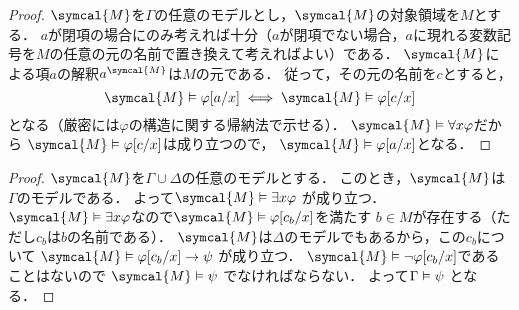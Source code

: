 \begin{proof}
	\(\symcal{M}\)を\(\Gamma\)の任意のモデルとし，\(\symcal{M}\)の対象領域を\(M\)とする．
	\(a\)が閉項の場合にのみ考えれば十分（\(a\)が閉項でない場合，\(a\)に現れる変数記号を\(M\)の任意の元の名前で置き換えて考えればよい）である．
	\(\symcal{M}\)による項\(a\)の解釈\(\interpretation{\symcal{M}}{a}\)は\(M\)の元である．
	従って，その元の名前を\(c\)とすると，
	\[
		\symcal{M} \satisfy \subst{\varphi}{a/x} \metaequivalent \symcal{M} \satisfy \subst{\varphi}{c/x}
	\]
	となる（厳密には\(\varphi\)の構造に関する帰納法で示せる）．
	\(\symcal{M} \satisfy \forall x \varphi\)だから
	\(\symcal{M} \satisfy \subst{\varphi}{c/x}\)は成り立つので，
	\(\symcal{M} \satisfy \subst{\varphi}{a/x}\)となる．
\end{proof}


\begin{proof}
	\(\symcal{M}\)を\(\Gamma \cup \Delta\)の任意のモデルとする．
	このとき，\(\symcal{M}\)は\(\Gamma\)のモデルである．
	よって\(\symcal{M} \satisfy \exists x \varphi\)
	が成り立つ．
	\(\symcal{M} \satisfy \exists x \varphi\)なので\(\symcal{M} \satisfy \subst{\varphi}{c_b/x}\)を満たす
	\(b \in M\)が存在する（ただし\(c_b\)は\(b\)の名前である）．
	\(\symcal{M}\)は\(\Delta\)のモデルでもあるから，この\(c_b\)について
	\(\symcal{M} \satisfy \subst{\varphi}{c_b/x} \to \psi\)
	が成り立つ．
	\(\symcal{M} \satisfy \lnot \subst{\varphi}{c_b/x}\)であることはないので
	\(\symcal{M} \satisfy \psi\)
	でなければならない．
	よって\(\Gamma \vDash \psi\)
	となる．
\end{proof}


